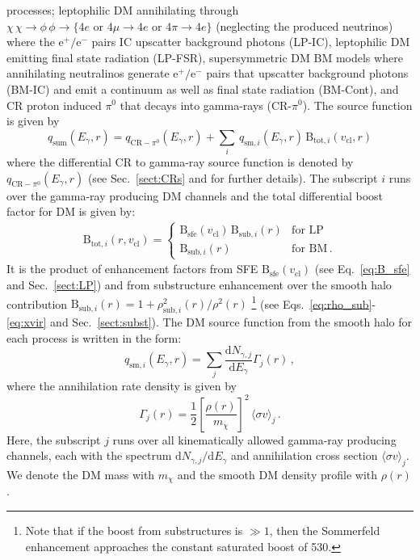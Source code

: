 \documentclass[10pt,aps,pra,reprint,amsmath,amsfonts,amssymb,showpacs,nofootinbib,floatfix]{revtex4-1}
\newcommand{\rmn}{\mathrm}
\newcommand{\sfe}{\rmn{sfe}}
\newcommand{\sub}{\rmn{sub}}
\newcommand{\B}{\rmn{B}}
\newcommand{\qCR}{q_{\rmn{CR}-\ensuremath{\pi^0}}}
\newcommand{\dd}{\rmn{d}}
\newcommand{\mx}{\ensuremath{m_{\chi}}}
\newcommand{\ngammaj}{\ensuremath{N_{\gamma,j}}}
\newcommand{\sigmaannv}{\ensuremath{\langle\sigma v\rangle}}
\newcommand{\sigv}{v_\rmn{cl}}
\newcommand{\egamma}{\ensuremath{E_{\gamma}}}
\newcommand{\eg}{E_\gamma}
\begin{document}
processes; leptophilic DM annihilating through
$\chi\,\chi\to\phi\,\phi\to\{4e\mbox{~or~}4\mu\to4e
\mbox{~or~}4\pi\to4e\}$ (neglecting the produced neutrinos) where the
$\rmn{e}^+/\rmn{e}^-$ pairs IC upscatter background photons (LP-IC),
leptophilic DM emitting final state radiation (LP-FSR), supersymmetric
DM BM models where annihilating neutralinos generate
$\rmn{e}^+/\rmn{e}^-$ pairs that upscatter background photons (BM-IC)
and emit a continuum as well as final state radiation (BM-Cont), and
CR proton induced $\pi^0$ that decays into gamma-rays
(CR-$\pi^0$). The source function is given by
\begin{equation}
q_\rmn{sum} (\eg,r) = \qCR(\eg,r)+
\sum_i \,q_{\rmn{sm},i}(\eg,r)\,\B_{\rmn{tot},i}(\sigv,r)
\end{equation}
where the differential CR to gamma-ray source function is denoted
by $\qCR(\eg,r)$ (see Sec.~\ref{sect:CRs} and
\cite{2010MNRAS.409..449P} for further details). The subscript $i$
runs over the gamma-ray producing DM channels and the total
differential boost factor for DM is given by:
\begin{eqnarray}
\B_{\rmn{tot},i}(r,\sigv) = \left\{\begin{array}{cc}
\B_\sfe(\sigv)\,\B_{\sub,i}(r) &\rmn{for\,\,LP}\\
\B_{\sub,i}(r) &\rmn{for\,\,BM\,.}\end{array}\right.
\end{eqnarray}
It is the product of enhancement factors from SFE $\B_\sfe(\sigv)$
(see Eq.~\ref{eq:B_sfe} and Sec.~\ref{sect:LP}) and from substructure
enhancement over the smooth halo contribution $\B_{\sub,i}(r) =
1+\rho_{\sub,i}^2(r)/\rho^2(r)$ \footnote{Note that if the boost
    from substructures is $\gg 1$, then the Sommerfeld enhancement
    approaches the constant saturated boost of 530.} (see
Eqs.~\ref{eq:rho_sub}-\ref{eq:xvir} and Sec.~\ref{sect:subst}). The
DM source function from the smooth halo for each process is written in
the form:
\begin{equation}
\label{eq:q_sm}
q_{\rmn{sm},i} (\egamma,r) = \sum_j
\frac{\dd \ngammaj}{\dd E_\gamma} \Gamma_j(r)\,,
\end{equation}
where the annihilation rate density is given by
\begin{equation}
\label{eq:ann_rate}
\Gamma_j(r) = \frac{1}{2} \left[\frac{\rho(r)}{\mx}\right]^2
\, \sigmaannv_j\,.
\end{equation}
Here, the subscript $j$ runs over all kinematically allowed gamma-ray
producing channels, each with the spectrum $\dd
  \ngammaj /\dd\eg$ and annihilation cross section $\sigmaannv_j$.
We denote the DM mass with $\mx$ and the smooth DM density profile
with $\rho(r)$.
\end{document}
